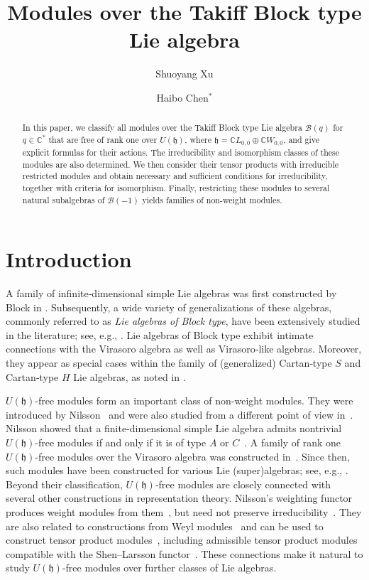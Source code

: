 \documentclass[a4paper]{amsart}
\title{Modules over the Takiff Block type Lie algebra}
\author[S.~Xu]{Shuoyang Xu}
\author[H.~Chen]{Haibo Chen$^\ast$}
\numberwithin{equation}{section}
\begin{document}
	\begin{abstract}
In this paper, we classify all modules over the Takiff Block type Lie algebra $\mathcal B(q)$ for $q\in\mathbb{C}^*$ that are free of rank one over $U(\mathfrak h)$, where $\mathfrak h=\mathbb C L_{0,0}\oplus\mathbb C W_{0,0}$, and give explicit formulas for their actions. The irreducibility and isomorphism classes of these modules are also determined. We then consider their tensor products with irreducible restricted modules and obtain necessary and sufficient conditions for irreducibility, together with criteria for isomorphism. Finally, restricting these modules to several natural subalgebras of $\mathcal B(-1)$ yields families of non-weight modules.
	\end{abstract}
	\maketitle

\section{Introduction}

A family of infinite‑dimensional simple Lie algebras was first constructed by Block in \cite{B}.
Subsequently, a wide variety of generalizations of these algebras, commonly referred to as \textit{Lie algebras of Block type},
have been extensively studied in the literature; see, e.g., \cite{OZ,Z,SXX13,SXX12,CGZ14,CG13,XZ13,CY18}.
Lie algebras of Block type exhibit intimate connections with the Virasoro algebra as well as Virasoro‑like algebras.
Moreover, they appear as special cases within the family of (generalized) Cartan‑type $S$ and Cartan‑type $H$ Lie algebras,
as noted in \cite{X}.


$U(\mathfrak h)$-free modules form an important class of non-weight modules. They were introduced by Nilsson~\cite{Nil15} and were also studied from a different point of view in~\cite{TZ18}. Nilsson showed that a finite-dimensional simple Lie algebra admits nontrivial $U(\mathfrak h)$-free modules if and only if it is of type $A$ or $C$~\cite{Nil15,Nil16}. A family of rank one $U(\mathfrak h)$-free modules over the Virasoro algebra was constructed in~\cite{GLZ13}. Since then, such modules have been constructed for various Lie (super)algebras; see, e.g., \cite{TZ15,CG17,HCS17,CG26}. Beyond their classification, $U(\mathfrak h)$-free modules are closely connected with several other constructions in representation theory. Nilsson's weighting functor produces weight modules from them~\cite{Nil16}, but need not preserve irreducibility~\cite{CDL}. They are also related to constructions from Weyl modules~\cite{LZ14} and can be used to construct tensor product modules~\cite{TZ13,TZ16}, including admissible tensor product modules compatible with the Shen--Larsson functor~\cite{CH20,LZY}. These connections make it natural to study $U(\mathfrak h)$-free modules over further classes of Lie algebras.
\end{document}
